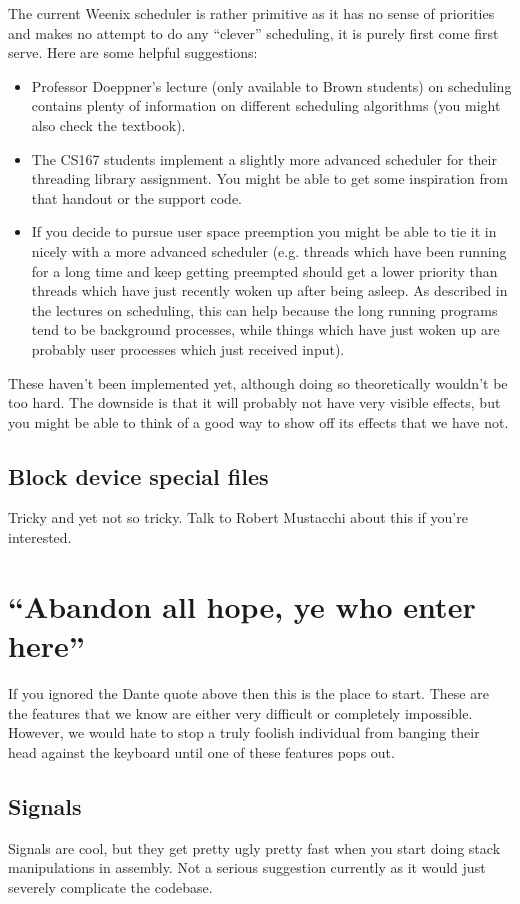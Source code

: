The current Weenix scheduler is rather primitive as it has no sense of priorities and makes no attempt to do any ``clever'' scheduling, it is purely first come first serve. Here are some helpful suggestions:
\begin{itemize}
    \item Professor Doeppner's lecture (only available to Brown students) on scheduling contains plenty of information on different scheduling algorithms (you might also check the textbook).
    \item The CS167 students implement a slightly more advanced scheduler for their threading library assignment. You might be able to get some inspiration from that handout or the support code.
    \item If you decide to pursue user space preemption you might be able to tie it in nicely with a more advanced scheduler (e.g. threads which have been running for a long time and keep getting preempted should get a lower priority than threads which have just recently woken up after being asleep. As described in the lectures on scheduling, this can help because the long running programs tend to be background processes, while things which have just woken up are probably user processes which just received input). %
\end{itemize}

These haven't been implemented yet, although doing so theoretically wouldn't be too hard. The downside is that it will probably not have very visible effects, but you might be able to think of a good way to show off its effects that we have not.

\subsection{Block device special files}
Tricky and yet not so tricky. Talk to Robert Mustacchi about this if you're interested.

\section{``Abandon all hope, ye who enter here''}
If you ignored the Dante quote above then this is the place to start. These are the features that we know are either very difficult or completely impossible. However, we would hate to stop a truly foolish individual from banging their head against the keyboard until one of these features pops out.

\subsection{Signals}
Signals are cool, but they get pretty ugly pretty fast when you start doing stack manipulations in assembly. Not a serious suggestion currently as it would just severely complicate the codebase.
